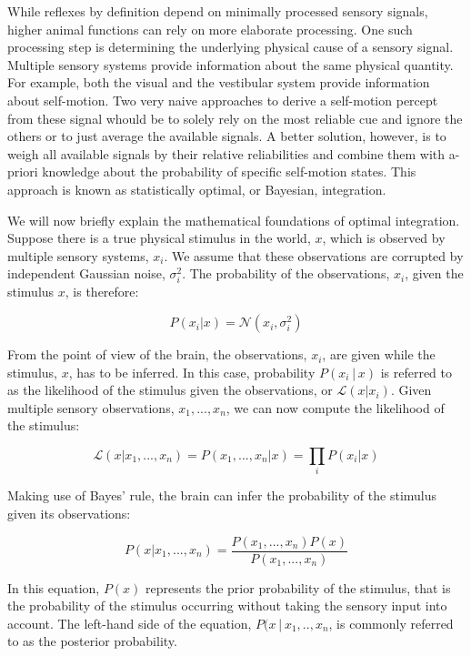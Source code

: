While reflexes by definition depend on minimally processed sensory signals, higher animal functions can rely on more elaborate processing. One such processing step is determining the underlying physical cause of a sensory signal. Multiple sensory systems provide information about the same physical quantity. For example, both the visual and the vestibular system provide information about self-motion. Two very naive approaches to derive a self-motion percept from these signal whould be to solely rely on the most reliable cue and ignore the others or to just average the available signals. A better solution, however, is to weigh all available signals by their  relative reliabilities and combine them with a-priori knowledge about the probability of specific self-motion states. This approach is known as statistically optimal, or Bayesian, integration. 

We will now briefly explain the mathematical foundations of optimal integration. Suppose there is a true physical stimulus in the world, $x$, which is observed by multiple sensory systems, $x_i$. We assume that these observations are corrupted by independent Gaussian noise, $\sigma_i^2$. The probability of the observations, $x_i$, given the stimulus $x$, is therefore:

\begin{equation}
P(x_i|x)= \mathcal{N}(x_i, \sigma_i^2)
\end{equation}

From the point of view of the brain, the observations, $x_i$, are given while the stimulus, $x$, has to be inferred. In this case, probability $P(x_i│x)$ is referred to as the likelihood of  the  stimulus given the observations, or $\mathcal{L}(x|x_i)$. Given multiple sensory observations, $x_1,...,x_n$, we can now compute the likelihood of the stimulus:

\begin{equation}
\mathcal{L}(x|x_1,...,x_n) = P(x_1,...,x_n|x) = \prod_i P(x_i|x)
\end{equation}

Making use of Bayes' rule, the  brain can infer the probability of the stimulus given its observations:

\begin{equation}
P(x|x_1,...,x_n) = \frac{P(x_1,...,x_n)P(x)}{P(x_1,...,x_n)}
\end{equation}

In this equation, $P(x)$ represents the prior probability of the stimulus, that is the probability of the stimulus occurring without taking the sensory input into account. The left-hand side of the equation, $P(x│x_1,..,x_n$, is commonly referred to as the posterior probability.

